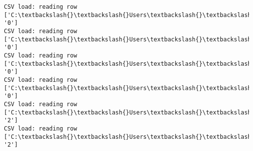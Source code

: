 \documentclass[11pt]{article}
\begin{document}
\begin{Verbatim}[commandchars=\\\{\}]
CSV load: reading row ['C:\textbackslash{}\textbackslash{}Users\textbackslash{}\textbackslash{}AbhishekGangadhar\textbackslash{}\textbackslash{}Downloads\textbackslash{}\textbackslash{}ActionRecog\textbackslash{}\textbackslash{}ActionRecog\textbackslash{}\textbackslash{}DataSets\textbackslash{}\textbackslash{}UCF11\textbackslash{}\textbackslash{}action\_youtube\_naudio\textbackslash{}\textbackslash{}biking\textbackslash{}\textbackslash{}v\_biking\_17\textbackslash{}\textbackslash{}v\_biking\_17\_03.avi', '0']
CSV load: reading row ['C:\textbackslash{}\textbackslash{}Users\textbackslash{}\textbackslash{}AbhishekGangadhar\textbackslash{}\textbackslash{}Downloads\textbackslash{}\textbackslash{}ActionRecog\textbackslash{}\textbackslash{}ActionRecog\textbackslash{}\textbackslash{}DataSets\textbackslash{}\textbackslash{}UCF11\textbackslash{}\textbackslash{}action\_youtube\_naudio\textbackslash{}\textbackslash{}biking\textbackslash{}\textbackslash{}v\_biking\_17\textbackslash{}\textbackslash{}v\_biking\_17\_04.avi', '0']
CSV load: reading row ['C:\textbackslash{}\textbackslash{}Users\textbackslash{}\textbackslash{}AbhishekGangadhar\textbackslash{}\textbackslash{}Downloads\textbackslash{}\textbackslash{}ActionRecog\textbackslash{}\textbackslash{}ActionRecog\textbackslash{}\textbackslash{}DataSets\textbackslash{}\textbackslash{}UCF11\textbackslash{}\textbackslash{}action\_youtube\_naudio\textbackslash{}\textbackslash{}biking\textbackslash{}\textbackslash{}v\_biking\_17\textbackslash{}\textbackslash{}v\_biking\_17\_05.avi', '0']
CSV load: reading row ['C:\textbackslash{}\textbackslash{}Users\textbackslash{}\textbackslash{}AbhishekGangadhar\textbackslash{}\textbackslash{}Downloads\textbackslash{}\textbackslash{}ActionRecog\textbackslash{}\textbackslash{}ActionRecog\textbackslash{}\textbackslash{}DataSets\textbackslash{}\textbackslash{}UCF11\textbackslash{}\textbackslash{}action\_youtube\_naudio\textbackslash{}\textbackslash{}biking\textbackslash{}\textbackslash{}v\_biking\_17\textbackslash{}\textbackslash{}v\_biking\_17\_06.avi', '0']
CSV load: reading row ['C:\textbackslash{}\textbackslash{}Users\textbackslash{}\textbackslash{}AbhishekGangadhar\textbackslash{}\textbackslash{}Downloads\textbackslash{}\textbackslash{}ActionRecog\textbackslash{}\textbackslash{}ActionRecog\textbackslash{}\textbackslash{}DataSets\textbackslash{}\textbackslash{}UCF11\textbackslash{}\textbackslash{}action\_youtube\_naudio\textbackslash{}\textbackslash{}trampoline\_jumping\textbackslash{}\textbackslash{}v\_jumping\_02\textbackslash{}\textbackslash{}v\_jumping\_02\_01.avi', '2']
CSV load: reading row ['C:\textbackslash{}\textbackslash{}Users\textbackslash{}\textbackslash{}AbhishekGangadhar\textbackslash{}\textbackslash{}Downloads\textbackslash{}\textbackslash{}ActionRecog\textbackslash{}\textbackslash{}ActionRecog\textbackslash{}\textbackslash{}DataSets\textbackslash{}\textbackslash{}UCF11\textbackslash{}\textbackslash{}action\_youtube\_naudio\textbackslash{}\textbackslash{}trampoline\_jumping\textbackslash{}\textbackslash{}v\_jumping\_02\textbackslash{}\textbackslash{}v\_jumping\_02\_02.avi', '2']

\end{Verbatim}
\end{document}
